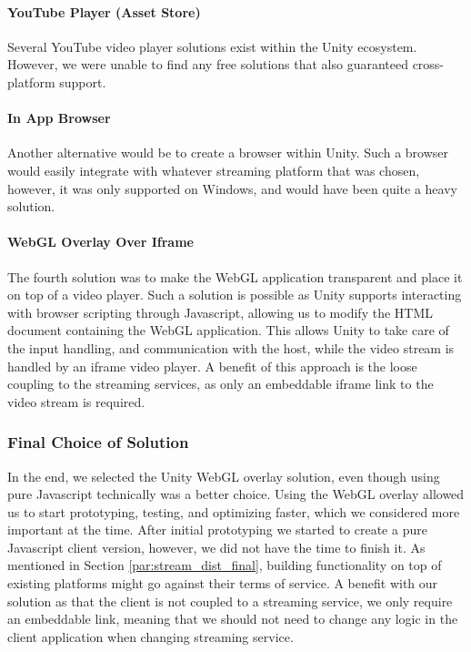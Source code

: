 \paragraph{YouTube Player (Asset Store)}
Several YouTube video player solutions exist within the Unity ecosystem. However, we were unable to find any free solutions that also guaranteed cross-platform support. 

\paragraph{In App Browser}
Another alternative would be to create a browser within Unity\cite{unity_simple_browser}. Such a browser would easily integrate with whatever streaming platform that was chosen, however, it was only supported on Windows, and would have been quite a heavy solution.

\paragraph{WebGL Overlay Over Iframe}
The fourth solution was to make the WebGL application transparent and place it on top of a video player. Such a solution is possible as Unity supports interacting with browser scripting through Javascript\cite{unity_webgl_javascript_interaction}, allowing us to modify the HTML document containing the WebGL application. 
This allows Unity to take care of the input handling, and communication with the host, while the video stream is handled by an iframe video player. A benefit of this approach is the loose coupling to the streaming services, as only an embeddable iframe link to the video stream is required.

\subsubsection{Final Choice of Solution}
\label{par:client_final}
In the end, we selected the Unity WebGL overlay solution, even though using pure Javascript technically was a better choice. Using the WebGL overlay allowed us to start prototyping, testing, and optimizing faster, which we considered more important at the time. After initial prototyping we started to create a pure Javascript client version, however, we did not have the time to finish it. 
As mentioned in Section \ref{par:stream_dist_final}, building functionality on top of existing platforms might go against their terms of service. A benefit with our solution as that the client is not coupled to a streaming service, we only require an embeddable link, meaning that we should not need to change any logic in the client application when changing streaming service.
